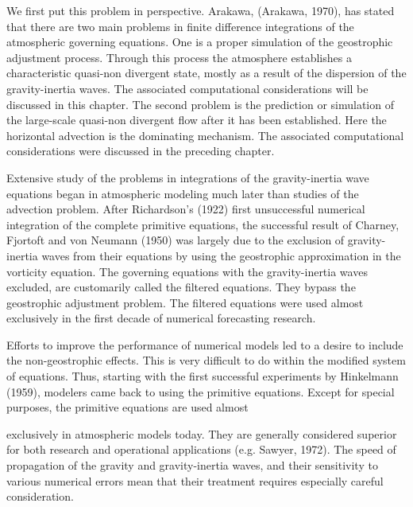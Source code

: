 We first put this problem in perspective. Arakawa, (Arakawa, 1970), has stated that there are two main problems in finite difference integrations of the atmospheric governing equations. One is a proper simulation of the geostrophic adjustment process. Through this process the atmosphere establishes a characteristic quasi-non divergent state, mostly as a result of the dispersion of the gravity-inertia waves. The associated computational considerations will be discussed in this chapter. The second problem is the prediction or simulation of the large-scale quasi-non divergent flow after it has been established. Here the horizontal advection is the dominating mechanism. The associated computational considerations were discussed in the preceding chapter.

Extensive study of the problems in integrations of the gravity-inertia wave equations began in atmospheric modeling much later than studies of the advection problem. After Richardson’s (1922) first unsuccessful numerical integration of the complete primitive equations, the successful result of Charney, Fjortoft and von Neumann (1950) was largely due to the exclusion of gravity-inertia waves from their equations by using the geostrophic approximation in the vorticity equation. The governing equations with the gravity-inertia waves excluded, are customarily called the filtered equations. They bypass the geostrophic adjustment problem. The filtered equations were used almost exclusively in the first decade of numerical forecasting research.

Efforts to improve the performance of numerical models led to a desire to include the non-geostrophic effects. This is very difficult to do within the modified system of equations. Thus, starting with the first successful experiments by Hinkelmann (1959), modelers came back to using the primitive equations. Except for special purposes, the primitive equations are used almost

exclusively in atmospheric models today. They are generally considered superior for both research and operational applications (e.g. Sawyer, 1972). The speed of propagation of the gravity and gravity-inertia waves, and their sensitivity to various numerical errors mean that their treatment requires especially careful consideration.

